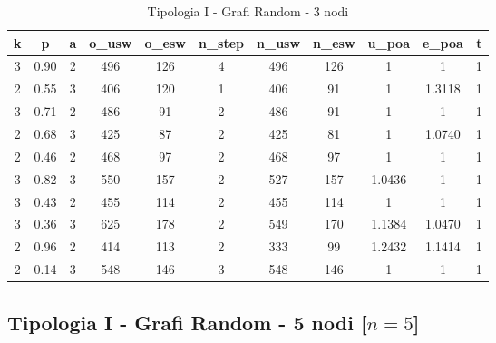 \begin{table}[H]
\centering
\scalebox{0.9} {
\begin{tabular}{|c|c|c|c|c|c|c|c|c|c|c|}
\hline
\textbf{k} & \textbf{p} & \textbf{a} & \textbf{o\_usw} & \textbf{o\_esw} & \textbf{n\_step} & \textbf{n\_usw} & \textbf{n\_esw} & \textbf{u\_poa} & \textbf{e\_poa} & \textbf{t} \\ \hline
3 & 0.90 & 2 & 496 & 126 & 4 & 496 & 126 & 1 & 1 & 1 \\ \hline
2 & 0.55 & 3 & 406 & 120 & 1 & 406 & 91 & 1 & 1.3118 & 1 \\ \hline
3 & 0.71 & 2 & 486 & 91 & 2 & 486 & 91 & 1 & 1 & 1 \\ \hline
2 & 0.68 & 3 & 425 & 87 & 2 & 425 & 81 & 1 & 1.0740 & 1 \\ \hline
2 & 0.46 & 2 & 468 & 97 & 2 & 468 & 97 & 1 & 1 & 1 \\ \hline
3 & 0.82 & 3 & 550 & 157 & 2 & 527 & 157 & 1.0436 & 1 & 1 \\ \hline
3 & 0.43 & 2 & 455 & 114 & 2 & 455 & 114 & 1 & 1 & 1 \\ \hline
3 & 0.36 & 3 & 625 & 178 & 2 & 549 & 170 & 1.1384 & 1.0470 & 1 \\ \hline
2 & 0.96 & 2 & 414 & 113 & 2 & 333 & 99 & 1.2432 & 1.1414 & 1 \\ \hline
2 & 0.14 & 3 & 548 & 146 & 3 & 548 & 146 & 1 & 1 & 1 \\ \hline
\end{tabular}
}
\caption{Tipologia I - Grafi Random - 3 nodi}
\label{tab:sperimentazione-tipo1-3nodi}
\end{table}


\subsection{Tipologia I - Grafi Random - 5 nodi [$n=5$]}

